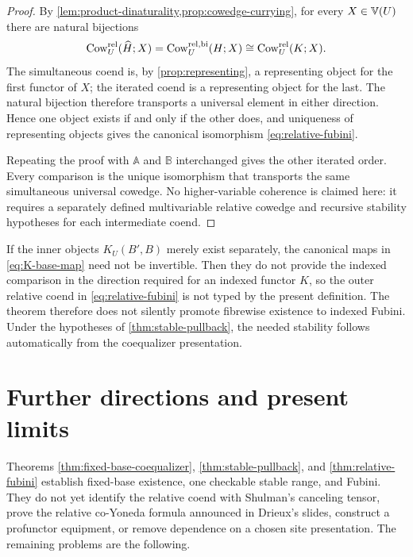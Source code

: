 \begin{proof}
By \cref{lem:product-dinaturality,prop:cowedge-currying}, for every
\(X\in\mathbb{V}(U)\) there are natural bijections
\[
  \operatorname{Cow}^{\mathrm{rel}}_U(\widehat H;X)
  =\operatorname{Cow}^{\mathrm{rel},\mathrm{bi}}_U(H;X)
  \cong\operatorname{Cow}^{\mathrm{rel}}_U(K;X).
\]
The simultaneous coend is, by \cref{prop:representing}, a representing
object for the first functor of \(X\); the iterated coend is a representing
object for the last.  The natural bijection therefore transports a universal
element in either direction.  Hence one object exists if and only if the
other does, and uniqueness of representing objects gives the canonical
isomorphism \cref{eq:relative-fubini}.

Repeating the proof with \(\mathbb A\) and \(\mathbb B\) interchanged gives
the other iterated order.  Every comparison is the unique isomorphism that
transports the same simultaneous universal cowedge.  No higher-variable
coherence is claimed here: it requires a separately defined multivariable
relative cowedge and recursive stability hypotheses for each intermediate
coend.
\end{proof}

\begin{remark}
\label{rem:fubini-stability-typing}
If the inner objects \(K_U(B',B)\) merely exist separately, the canonical
maps in \cref{eq:K-base-map} need not be invertible.  Then they do not provide
the indexed comparison in the direction required for an indexed functor
\(K\), so the outer relative coend in \cref{eq:relative-fubini} is not typed
by the present definition.  The theorem therefore does not silently promote
fibrewise existence to indexed Fubini.  Under the hypotheses of
\cref{thm:stable-pullback}, the needed stability follows automatically from
the coequalizer presentation.
\end{remark}

\section{Further directions and present limits}
\label{sec:next}

Theorems \ref{thm:fixed-base-coequalizer}, \ref{thm:stable-pullback}, and
\ref{thm:relative-fubini} establish fixed-base existence, one checkable
stable range, and Fubini.  They do not yet identify the relative coend with
Shulman's canceling tensor, prove the relative co-Yoneda formula announced in
Drieux's slides, construct a profunctor equipment, or remove dependence on a
chosen site presentation.  The remaining problems are the following.

